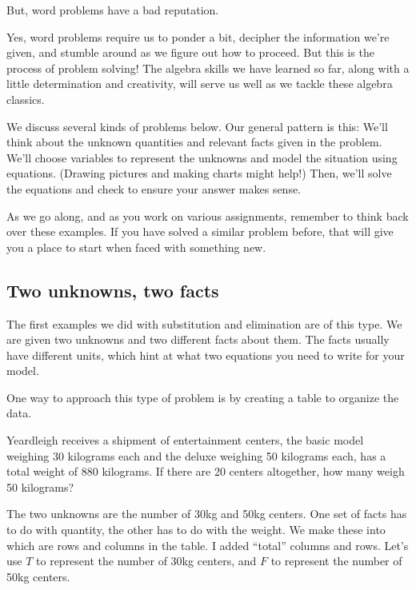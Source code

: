 But, word problems have a bad reputation.

Yes, word problems require us to ponder a bit, decipher the information we're given, and stumble around as we figure out how to proceed. But this is the process of problem solving! The algebra skills we have learned so far, along with a little determination and creativity, will serve us well as we tackle these algebra classics.

We discuss several kinds of problems below. Our general pattern is this: We'll think about the unknown quantities and relevant facts given in the problem. We'll choose variables to represent the unknowns and model the situation using equations. (Drawing pictures and making charts might help!) Then, we'll solve the equations and check to ensure your answer makes sense.

As we go along, and as you work on various assignments, remember to think back over these examples. If you have solved a similar problem before, that will give you a place to start when faced with something new.

\subsection*{Two unknowns, two facts}

The first examples we did with substitution and elimination are of this type. We are given two unknowns and two different facts about them. The facts usually have different units, which hint at what two equations you need to write for your model.

One way to approach this type of problem is by creating a table to organize the data.

\begin{boxex}
Yeardleigh receives a shipment of entertainment centers, the basic model weighing 30 kilograms each and the deluxe weighing 50 kilograms each, has a total weight of 880 kilograms. If there are 20 centers altogether, how many weigh 50 kilograms?
\end{boxex}

The two unknowns are the number of 30kg and 50kg centers. One set of facts has to do with quantity, the other has to do with the weight. We make these into which are rows and columns in the table. I added ``total'' columns and rows. Let's use $T$ to represent the number of 30kg centers, and $F$ to represent the number of 50kg centers.

